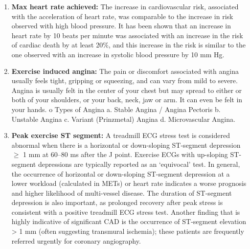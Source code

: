 \documentclass{book}
\begin{document}
\begin{enumerate}
		\item \textbf{Max heart rate achieved:} The increase in cardiovascular risk, associated with the acceleration of heart rate, was comparable to the increase in risk observed with high blood pressure. It has been shown that an increase in heart rate by 10 beats per minute was associated with an increase in the risk of cardiac death by at least 20\%, and this increase in the risk is similar to the one observed with an increase in systolic blood pressure by 10 mm Hg.
		
		\item \textbf{Exercise induced angina:} The pain or discomfort associated with angina usually feels tight, gripping or squeezing, and can vary from mild to severe. Angina is usually felt in the center of your chest but may spread to either or both of your shoulders, or your back, neck, jaw or arm. It can even be felt in your hands. o Types of Angina a. Stable Angina / Angina Pectoris b. Unstable Angina c. Variant (Prinzmetal) Angina d. Microvascular Angina.
		
		\item \textbf{Peak exercise ST segment:} A treadmill ECG stress test is considered abnormal when there is a horizontal or down-sloping ST-segment depression $\geq$ 1 mm at 60–80 ms after the J point. Exercise ECGs with up-sloping ST-segment depressions are typically reported as an ‘equivocal’ test. In general, the occurrence of horizontal or down-sloping ST-segment depression at a lower workload (calculated in METs) or heart rate indicates a worse prognosis and higher likelihood of multi-vessel disease. The duration of ST-segment depression is also important, as prolonged recovery after peak stress is consistent with a positive treadmill ECG stress test. Another finding that is highly indicative of significant CAD is the occurrence of ST-segment elevation > 1 mm (often suggesting transmural ischemia); these patients are frequently referred urgently for coronary angiography.
	\end{enumerate}
\end{document}

